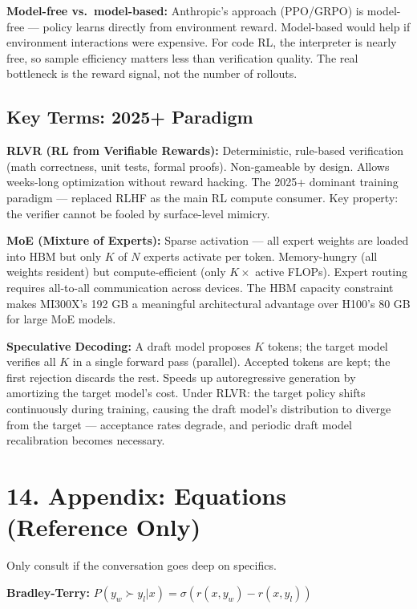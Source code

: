 \textbf{Model-free vs.\ model-based:} Anthropic's approach (PPO/GRPO) is model-free --- policy learns directly from environment reward. Model-based would help if environment interactions were expensive. For code RL, the interpreter is nearly free, so sample efficiency matters less than verification quality. The real bottleneck is the reward signal, not the number of rollouts.

\subsection{Key Terms: 2025+ Paradigm}

\textbf{RLVR (RL from Verifiable Rewards):} Deterministic, rule-based verification (math correctness, unit tests, formal proofs). Non-gameable by design. Allows weeks-long optimization without reward hacking. The 2025+ dominant training paradigm --- replaced RLHF as the main RL compute consumer. Key property: the verifier cannot be fooled by surface-level mimicry.

\textbf{MoE (Mixture of Experts):} Sparse activation --- all expert weights are loaded into HBM but only $K$ of $N$ experts activate per token. Memory-hungry (all weights resident) but compute-efficient (only $K\times$ active FLOPs). Expert routing requires all-to-all communication across devices. The HBM capacity constraint makes MI300X's 192 GB a meaningful architectural advantage over H100's 80 GB for large MoE models.

\textbf{Speculative Decoding:} A draft model proposes $K$ tokens; the target model verifies all $K$ in a single forward pass (parallel). Accepted tokens are kept; the first rejection discards the rest. Speeds up autoregressive generation by amortizing the target model's cost. Under RLVR: the target policy shifts continuously during training, causing the draft model's distribution to diverge from the target --- acceptance rates degrade, and periodic draft model recalibration becomes necessary.

\section{14. Appendix: Equations (Reference Only)}

\small
Only consult if the conversation goes deep on specifics.

\textbf{Bradley-Terry:} $P(y_w \succ y_l | x) = \sigma(r(x, y_w) - r(x, y_l))$

